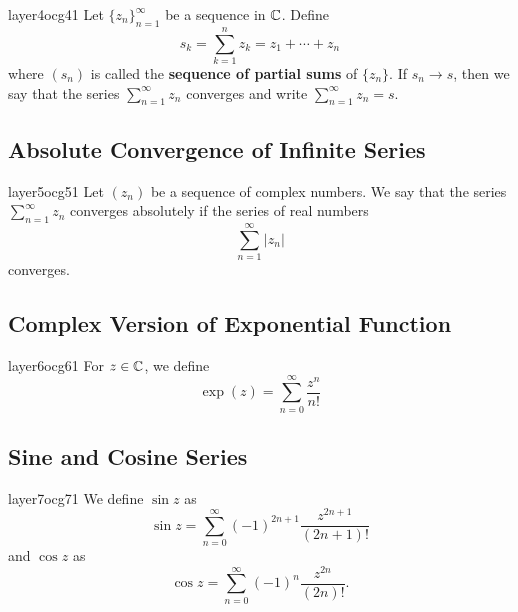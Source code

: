 \documentclass[a4paper]{article}
\begin{document}
\begin{ocg}{layer4}{ocg4}{1}
    Let \( \{ {z}_{n} \}_{n=1}^{\infty } \) be a sequence in \( \mathbb{C}  \). Define 
    \[  {s}_{k} = \sum_{ k=1  }^{ n } {z}_{k } = {z}_{1} + \cdots + {z}_{n} \]
    where \( ({s}_{n}) \) is called the \textbf{sequence of partial sums} of \( \{ {z}_{n} \}  \). If \( {s}_{n} \to s \), then we say that the series \( \sum_{ n=1  }^{ \infty  } {z}_{n} \) converges and write \( \sum_{ n=1  }^{ \infty  } {z}_{n} = s  \).
\end{ocg}
\newline
{}

\subsection*{Absolute Convergence of Infinite Series}
\begin{ocg}{layer5}{ocg5}{1}
    Let \( ({z}_{n}) \) be a sequence of complex numbers. We say that the series \( \sum_{  n = 1  }^{  \infty  } {z}_{n} \) converges absolutely if the series of real numbers 
    \[  \sum_{ n=1  }^{ \infty   } | {z}_{n} |  \] converges.
\end{ocg}
\newline
{}

\subsection*{Complex Version of Exponential Function}

\begin{ocg}{layer6}{ocg6}{1}
    For \( z \in \mathbb{C}  \), we define 
    \[ \exp(z) = \sum_{ n=0  }^{  \infty  } \frac{ z^{n} }{ n!  }   \]
\end{ocg}
\newline
{}

\subsection*{Sine and Cosine Series}

\begin{ocg}{layer7}{ocg7}{1}
         We define  \( \sin z  \) as
            \[ \sin z = \sum_{ n=0 }^{ \infty  } (-1)^{2n+1} \frac{ z^{2n+1} }{ (2n+1)! } \]
            and \( \cos z  \) as 
            \[  \cos z  =  \sum_{ n = 0  }^{ \infty  } (-1)^{n} \frac{ z^{2n} }{ (2n)! }.  \]
\end{ocg}
\newline
{}




    
\end{document}
